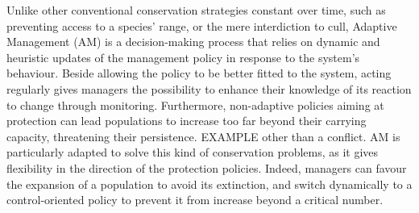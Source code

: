 \documentclass[12pt,a4paper]{article}
\begin{document}
Unlike other conventional conservation strategies constant over time, such as preventing access to a species' range, or the mere interdiction to cull,
Adaptive Management (AM) is a decision-making process that relies on dynamic and heuristic updates of the management policy in response to the system's behaviour.
Beside allowing the policy to be better fitted to the system, acting regularly gives managers the possibility to enhance their knowledge of its reaction to change through monitoring. %
%
%
%
Furthermore, non-adaptive policies aiming at protection can lead populations to increase too far beyond their carrying capacity, threatening their persistence.
EXAMPLE other than a conflict.
AM is particularly adapted to solve this kind of conservation problems, as it gives flexibility in the direction of the protection policies.
Indeed, managers can favour the expansion of a population to avoid its extinction, and switch dynamically to a control-oriented policy to prevent it from increase beyond a critical number. 
\end{document}
